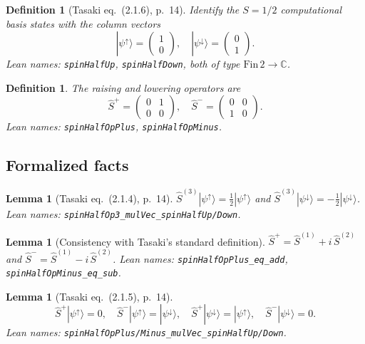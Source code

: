 \documentclass[a4paper,11pt]{article}
\newtheorem{lemma}[theorem]{Lemma}
\newtheorem{definition}[theorem]{Definition}
\begin{document}
\begin{definition}[Tasaki eq.~(2.1.6), p.~14]
Identify the $S = 1/2$ computational basis states with the column vectors
\[
  |\psi^\uparrow\rangle
    = \begin{pmatrix} 1 \\ 0 \end{pmatrix},\quad
  |\psi^\downarrow\rangle
    = \begin{pmatrix} 0 \\ 1 \end{pmatrix}.
\]
Lean names: \texttt{spinHalfUp}, \texttt{spinHalfDown}, both of type
$\mathrm{Fin}\,2 \to \mathbb{C}$.
\end{definition}

\begin{definition}
The raising and lowering operators are
\[
  \hat S^+ = \begin{pmatrix} 0 & 1 \\ 0 & 0 \end{pmatrix},\quad
  \hat S^- = \begin{pmatrix} 0 & 0 \\ 1 & 0 \end{pmatrix}.
\]
Lean names: \texttt{spinHalfOpPlus}, \texttt{spinHalfOpMinus}.
\end{definition}

\subsection{Formalized facts}

\begin{lemma}[Tasaki eq.~(2.1.4), p.~14]
$\hat S^{(3)}|\psi^\uparrow\rangle = \tfrac{1}{2}|\psi^\uparrow\rangle$
and
$\hat S^{(3)}|\psi^\downarrow\rangle = -\tfrac{1}{2}|\psi^\downarrow\rangle$.
Lean names: \texttt{spinHalfOp3\_mulVec\_spinHalfUp/Down}.
\end{lemma}

\begin{lemma}[Consistency with Tasaki's standard definition]
$\hat S^+ = \hat S^{(1)} + i\,\hat S^{(2)}$ and
$\hat S^- = \hat S^{(1)} - i\,\hat S^{(2)}$.
Lean names: \texttt{spinHalfOpPlus\_eq\_add}, \texttt{spinHalfOpMinus\_eq\_sub}.
\end{lemma}

\begin{lemma}[Tasaki eq.~(2.1.5), p.~14]
\[
  \hat S^+|\psi^\uparrow\rangle = 0,\quad
  \hat S^-|\psi^\uparrow\rangle = |\psi^\downarrow\rangle,\quad
  \hat S^+|\psi^\downarrow\rangle = |\psi^\uparrow\rangle,\quad
  \hat S^-|\psi^\downarrow\rangle = 0.
\]
Lean names: \texttt{spinHalfOpPlus/Minus\_mulVec\_spinHalfUp/Down}.
\end{lemma}
\end{document}
